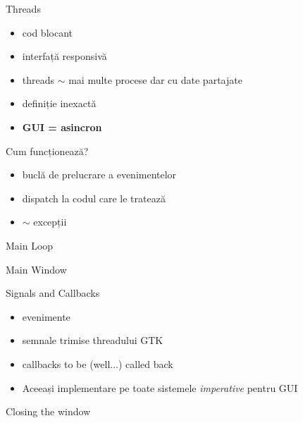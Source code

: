 \documentclass{beamer}
\begin{document}
\begin{frame}{Threads}
  \begin{itemize}[<+->]
    \item cod blocant
    \item interfață responsivă
    \item threads $\sim$ mai multe procese dar cu date partajate
    \item definiție inexactă
    \item \textbf{GUI = asincron}
  \end{itemize}
\end{frame}

\begin{frame}{Cum funcționează?}
  \begin{itemize}[<+->]
    \item buclă de prelucrare a evenimentelor
    \item dispatch la codul care le tratează
    \item $\sim$ excepții
  \end{itemize}
\end{frame}

\begin{frame}{Main Loop}
  
\end{frame}

\begin{frame}{Main Window}
  
\end{frame}

\begin{frame}{Signals and Callbacks}
  \begin{itemize}
    \item evenimente
      \pause
    \item semnale trimise threadului GTK
    \item callbacks to be (well...) called back
      \pause
    \item Aceeași implementare pe toate sistemele \textit{imperative} pentru GUI
  \end{itemize}
\end{frame}

\begin{frame}{Closing the window}
  
\end{frame}
\end{document}
